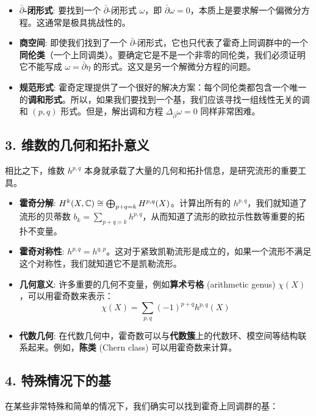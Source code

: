 \documentclass{amsart}
\let\originalmathbb\mathbb
\renewcommand{\mathbb}[1]{%
    \ifstrequal{#1}{1}{\mathbbm{#1}}{\originalmathbb{#1}}%
}
\theoremstyle{plain}
\theoremstyle{definition}
\theoremstyle{remark}
\begin{document}
\begin{itemize}
	\item \textbf{$\bar{\partial}$-闭形式}: 要找到一个 $\bar{\partial}$-闭形式 $\omega$，即 $\bar{\partial}\omega=0$，本质上是要求解一个偏微分方程。这通常是极具挑战性的。
	\item \textbf{商空间}: 即使我们找到了一个 $\bar{\partial}$-闭形式，它也只代表了霍奇上同调群中的一个\textbf{同伦类}（一个上同调类）。要确定它是不是一个非零的同伦类，我们必须证明它不能写成 $\omega = \bar{\partial}\eta$ 的形式。这又是另一个解微分方程的问题。
	\item \textbf{规范形式}: 霍奇定理提供了一个很好的解决方案：每个同伦类都包含一个唯一的\textbf{调和形式}。所以，如果我们要找到一个基，我们应该寻找一组线性无关的调和 $(p,q)$ 形式。但是，解出调和方程 $\Delta_{\bar{\partial}} \omega = 0$ 同样非常困难。
\end{itemize}

\subsection{3. 维数的几何和拓扑意义}

相比之下，维数 $h^{p,q}$ 本身就承载了大量的几何和拓扑信息，是研究流形的重要工具。

\begin{itemize}
	\item \textbf{霍奇分解}: $H^k(X, \mathbb{C}) \cong \bigoplus_{p+q=k} H^{p,q}(X)$。计算出所有的 $h^{p,q}$，我们就知道了流形的贝蒂数 $b_k = \sum_{p+q=k} h^{p,q}$，从而知道了流形的欧拉示性数等重要的拓扑不变量。
	\item \textbf{霍奇对称性}: $h^{p,q} = h^{q,p}$。这对于紧致凯勒流形是成立的，如果一个流形不满足这个对称性，我们就知道它不是凯勒流形。
	\item \textbf{几何意义}: 许多重要的几何不变量，例如\textbf{算术亏格} (arithmetic genus) $\chi(X)$，可以用霍奇数来表示：
\[
\chi(X) = \sum_{p,q} (-1)^{p+q} h^{p,q}(X)
\]
	\item \textbf{代数几何}: 在代数几何中，霍奇数可以与\textbf{代数簇}上的代数环、模空间等结构联系起来。例如，\textbf{陈类} (Chern class) 可以用霍奇数来计算。
\end{itemize}

\subsection{4. 特殊情况下的基}

在某些非常特殊和简单的情况下，我们确实可以找到霍奇上同调群的基：
\end{document}
